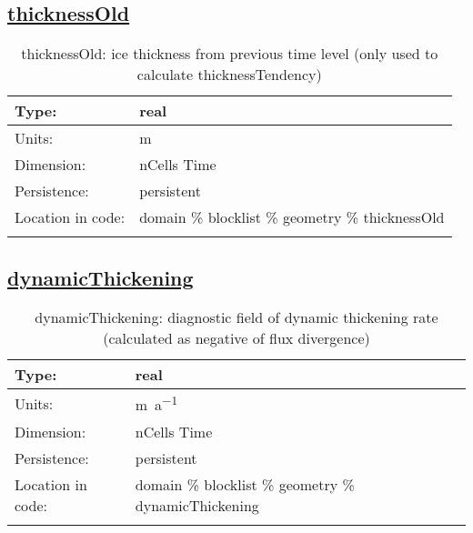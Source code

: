 \subsection[thicknessOld]{\hyperref[sec:var_tab_geometry]{thicknessOld}}
\label{subsec:var_sec_geometry_thicknessOld}
\begin{center}
\begin{longtable}{| p{2.0in} | p{4.0in} |}
        \hline 
        Type: & real \\
        \hline 
        Units: & \si{m} \\
        \hline 
        Dimension: & nCells Time \\
        \hline 
        Persistence: & persistent \\
        \hline 
         Location in code: & domain \% blocklist \% geometry \% thicknessOld \\
         \hline 
    \caption{thicknessOld: ice thickness from previous time level (only used to calculate thicknessTendency)}
\end{longtable}
\end{center}
\subsection[dynamicThickening]{\hyperref[sec:var_tab_geometry]{dynamicThickening}}
\label{subsec:var_sec_geometry_dynamicThickening}
\begin{center}
\begin{longtable}{| p{2.0in} | p{4.0in} |}
        \hline 
        Type: & real \\
        \hline 
        Units: & \si{m.a^{-1}} \\
        \hline 
        Dimension: & nCells Time \\
        \hline 
        Persistence: & persistent \\
        \hline 
         Location in code: & domain \% blocklist \% geometry \% dynamicThickening \\
         \hline 
    \caption{dynamicThickening: diagnostic field of dynamic thickening rate (calculated as negative of flux divergence)}
\end{longtable}
\end{center}
